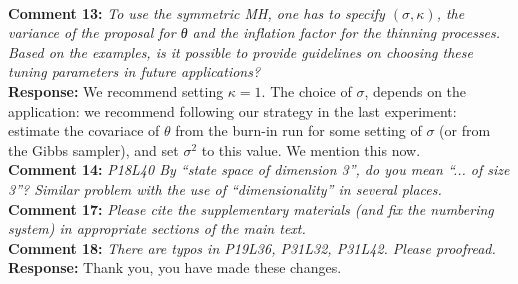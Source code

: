 \documentclass[11pt]{article}
\newcommand{\rev}[2]{\textbf{Comment #1: }\emph{#2}}
\newcommand{\resp}{\textbf{Response: }}
\begin{document}
~\\ 
\rev{13}{To use the symmetric MH, one has to specify $(\sigma, \kappa)$, the variance of the proposal for θ and the inflation factor for the thinning processes. Based on the examples, is it possible to provide guidelines on choosing these tuning parameters in future applications?} 
\\ 
\resp{We recommend setting $\kappa = 1$. The choice of $\sigma$, depends on the application: we recommend following our strategy in the last experiment: estimate the covariace of $\theta$ from the burn-in run for some setting of $\sigma$ (or from the Gibbs sampler), and set $\sigma^2$ to this  value. We mention this now.}
~\\

\noindent \rev{14}{P18L40 By “state space of dimension 3”, do you mean “... of size 3”? Similar problem with the use of “dimensionality” in several places.} \\
\noindent \rev{17}{Please cite the supplementary materials (and fix the numbering system) in appropriate sections of the main text.} \\
\noindent \rev{18}{There are typos in P19L36, P31L32, P31L42. Please proofread.}\\
\resp{Thank you, you have made these changes.}
\end{document}
